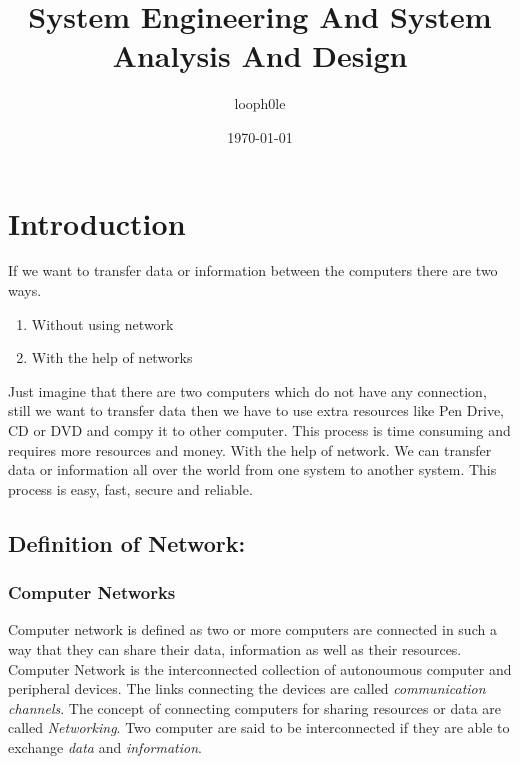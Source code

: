 \documentclass[11pt]{article}
\author{looph0le}
\date{\today}
\title{System Engineering And System Analysis And Design}
\begin{document}
\maketitle
\tableofcontents


\section{Introduction}
\label{sec:orgb98d17f}
If we want to transfer data or information between the computers there are two ways.
\begin{enumerate}
\item Without using network
\item With the help of networks
\end{enumerate}
Just imagine that there are two computers which do not have any connection, still we want to transfer
data then we have to use extra resources like Pen Drive, CD or DVD and compy it to other computer.
This process is time consuming and requires more resources and money.
With the help of network. We can transfer data or information all over the world from one system to another system.
This process is easy, fast, secure and reliable.
\subsection{Definition of Network:}
\label{sec:org37b1f1b}
\subsubsection{Computer Networks}
\label{sec:org7890974}
Computer network is defined as two or more computers are connected in such a way that they can
share their data, information as well as their resources.
Computer Network is the interconnected collection of autonoumous computer and peripheral devices.
The links connecting the devices are called \emph{communication channels}.
The concept of connecting computers for sharing resources or data are called \emph{Networking}.
Two computer are said to be interconnected if they are able to exchange \emph{data} and \emph{information}.
\end{document}
